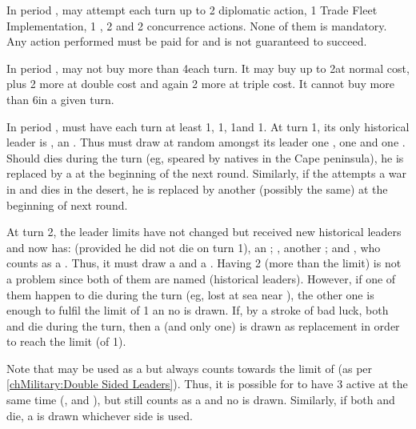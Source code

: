 \begin{exemple}
  In period , \POR may attempt each turn up to 2 diplomatic action,
  1 Trade Fleet Implementation, 1 \COL, 2 \TP and 2 concurrence actions. None
  of them is mandatory. Any action performed must be paid for and is not
  guaranteed to succeed.

  In period , \POR may not buy more than 4\ND each turn. It may buy
  up to 2\LD at normal cost, plus 2 more at double cost and again 2 more at
  triple cost. It cannot buy more than 6\LD in a given turn.

  In period , \POR must have each turn at least 1\LeaderG,
  1\LeaderA, 1\LeaderC and 1\LeaderE. At turn 1, its only historical leader is
  \leaderDias, an \LeaderE. Thus \POR must draw at random amongst its leader
  one \anonyme\LeaderG, one \anonyme\LeaderA and one \anonyme\LeaderC. Should
  \leaderDias dies during the turn (eg, speared by natives in the Cape
  peninsula), he is replaced by a \anonyme\LeaderE at the beginning of the
  next round. Similarly, if the \anonyme\LeaderG attempts a war in \paysMaroc
  and dies in the desert, he is replaced by another \anonyme\LeaderG (possibly
  the same) at the beginning of next round.

  At turn 2, the leader limits have not changed but \POR received new
  historical leaders and now has: \leaderDias (provided he did not die on turn
  1), an \LeaderE ; \leaderCabral, another \LeaderE ; and ,
  who counts as a \LeaderC. Thus, it must draw a \anonyme\LeaderG and a
  \anonyme\LeaderA. Having 2 \LeaderE (more than the limit) is not a problem
  since both of them are named (historical leaders). However, if one of them
  happen to die during the turn (eg, lost at sea near \continentBresil), the
  other one is enough to fulfil the limit of 1 an no \anonyme\LeaderE is
  drawn. If, by a stroke of bad luck, both \leaderDias and \leaderCabral die
  during the turn, then a \anonyme\LeaderE (and only one) is drawn as
  replacement in order to reach the limit (of 1).

  Note that  may be used as a \LeaderE but always counts
  towards the limit of \LeaderC (as per \ref{chMilitary:Double Sided
    Leaders}). Thus, it is possible for \POR to have 3 \LeaderE active at the
  same time (\leaderDias, \leaderCabral and ), but  still counts as a \LeaderC and no \anonyme\LeaderC is
  drawn. Similarly, if both \leaderDias and \leaderCabral die, a
  \anonyme\LeaderE is drawn whichever side  is used.
\end{exemple}




